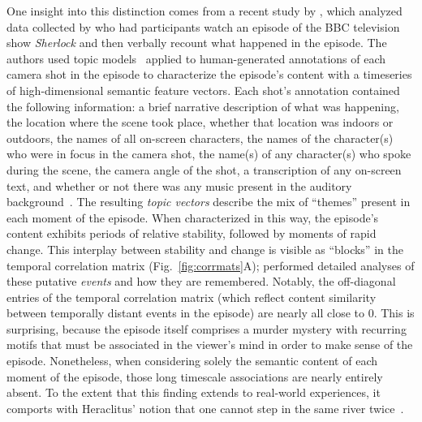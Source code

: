 \documentclass{article}
\begin{document}
One insight into this distinction comes from a recent study by \cite{HeusEtal18c}, which analyzed data collected by \cite{ChenEtal17} who had participants watch an episode of the BBC television show \textit{Sherlock} and then verbally recount what happened in the episode.  The authors used topic models~\citep{BleiEtal03} applied to human-generated annotations of each camera shot in the episode to characterize the episode's content with a timeseries of high-dimensional semantic feature vectors.  Each shot's annotation contained the following information: a brief narrative description of what was happening, the location where the scene took place, whether that location was indoors or outdoors, the names of all on-screen characters, the names of the character(s) who were in focus in the camera shot, the name(s) of any character(s) who spoke during the scene, the camera angle of the shot, a transcription of any on-screen text, and whether or not there was any music present in the auditory background~\citep[full details may be found in][]{ChenEtal17}.  The resulting \textit{topic vectors} describe the mix of ``themes'' present in each moment of the episode.  When characterized in this way, the episode's content exhibits periods of relative stability, followed by moments of rapid change. This interplay between stability and change is visible as ``blocks'' in the temporal correlation matrix (Fig.~\ref{fig:corrmats}A); \cite{HeusEtal18c} performed detailed analyses of these putative \textit{events} and how they are remembered.  Notably, the off-diagonal entries of the temporal correlation matrix (which reflect content similarity between temporally distant events in the episode) are nearly all close to 0.  This is surprising, because the episode itself comprises a murder mystery with recurring motifs that must be associated in the viewer's mind in order to make sense of the episode.  Nonetheless, when considering solely the semantic content of each moment of the episode, those long timescale associations are nearly entirely absent.  To the extent that this finding extends to real-world experiences, it comports with Heraclitus' notion that one cannot step in the same river twice~\citep{Hera}.
\end{document}
